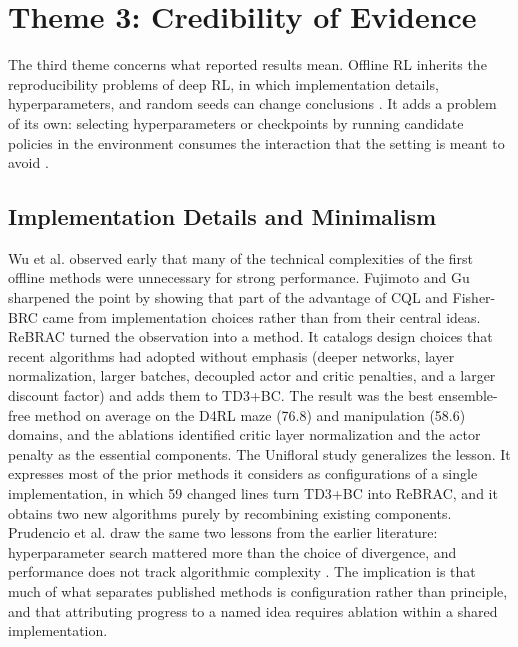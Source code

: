 \documentclass[conference]{IEEEtran}
\begin{document}
\section{Theme 3: Credibility of Evidence}
\label{sec:theme3}
The third theme concerns what reported results mean. Offline RL inherits the reproducibility problems of deep RL, in which implementation details, hyperparameters, and random seeds can change conclusions \cite{henderson2018matters,agarwal2021precipice}. It adds a problem of its own: selecting hyperparameters or checkpoints by running candidate policies in the environment consumes the interaction that the setting is meant to avoid \cite{paine2020hyperparameter}.

\subsection{Implementation Details and Minimalism}
Wu et al. \cite{wu2019brac} observed early that many of the technical complexities of the first offline methods were unnecessary for strong performance. Fujimoto and Gu \cite{fujimoto2021td3bc} sharpened the point by showing that part of the advantage of CQL and Fisher-BRC \cite{kostrikov2021fisherbrc} came from implementation choices rather than from their central ideas. ReBRAC \cite{tarasov2023rebrac} turned the observation into a method. It catalogs design choices that recent algorithms had adopted without emphasis (deeper networks, layer normalization, larger batches, decoupled actor and critic penalties, and a larger discount factor) and adds them to TD3+BC. The result was the best ensemble-free method on average on the D4RL maze (76.8) and manipulation (58.6) domains, and the ablations identified critic layer normalization and the actor penalty as the essential components. The Unifloral study \cite{jackson2025unifloral} generalizes the lesson. It expresses most of the prior methods it considers as configurations of a single implementation, in which 59 changed lines turn TD3+BC into ReBRAC, and it obtains two new algorithms purely by recombining existing components. Prudencio et al. draw the same two lessons from the earlier literature: hyperparameter search mattered more than the choice of divergence, and performance does not track algorithmic complexity \cite{prudencio2024survey}. The implication is that much of what separates published methods is configuration rather than principle, and that attributing progress to a named idea requires ablation within a shared implementation.
\end{document}

